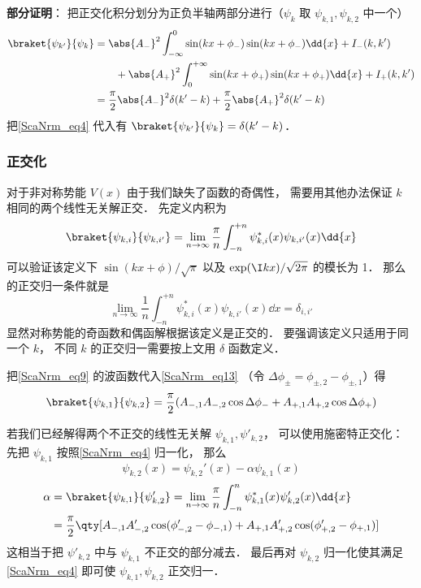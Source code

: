 \textbf{部分证明}： 把正交化积分划分为正负半轴两部分进行（$\psi_{k}$ 取 $\psi_{k,1}, \psi_{k,2}$ 中一个）
\begin{equation}
\begin{aligned}
\braket{\psi_{k'}}{\psi_{k}} &= \abs{A_-}^2\int_{-\infty}^0 \sin(kx + \phi_{-})\sin(kx + \phi_{-}) \dd{x} + I_-(k,k')\\
&\qquad+ \abs{A_+}^2\int_0^{+\infty} \sin(kx + \phi_{+})\sin(kx + \phi_{+}) \dd{x}   + I_+(k,k')\\
&= \frac{\pi}{2}\abs{A_-}^2\delta(k'-k) + \frac{\pi}{2}\abs{A_+}^2 \delta(k'-k)
\end{aligned}
\end{equation}
把\autoref{ScaNrm_eq4} 代入有 $\braket{\psi_{k'}}{\psi_{k}} = \delta(k'-k)$．

\subsubsection{正交化}
对于非对称势能 $V(x)$ 由于我们缺失了函数的奇偶性， 需要用其他办法保证 $k$ 相同的两个线性无关解正交． 先定义内积为
\begin{equation}\label{ScaNrm_eq13}
\braket{\psi_{k,i}}{\psi_{k,i'}} = \lim_{n\to\infty}\frac{\pi}{n}\int_{-n}^{+n} \psi_{k,i}^*(x) \psi_{k,i'}(x) \dd{x}
\end{equation}
可以验证该定义下 $\sin(kx+\phi)/\sqrt{\pi}$ 以及 $\exp(\I kx)/\sqrt{2\pi}$ 的模长为 1． 那么的正交归一条件就是
\begin{equation}\label{ScaNrm_eq7}
\lim_{n\to\infty}\frac{1}{n}\int_{-n}^{+n} \psi_{k,i}^*(x) \psi_{k,i'}(x) \dd{x} = \delta_{i,i'}
\end{equation}
显然对称势能的奇函数和偶函解根据该定义是正交的． 要强调该定义只适用于同一个 $k$， 不同 $k$ 的正交归一需要按上文用 $\delta$ 函数定义．

把\autoref{ScaNrm_eq9} 的波函数代入\autoref{ScaNrm_eq13} （令 $\Delta\phi_\pm = \phi_{\pm, 2} - \phi_{\pm, 1}$）得
\begin{equation}
\braket{\psi_{k,1}}{\psi_{k,2}} = \frac{\pi}{2}(A_{-,1}A_{-,2}\cos\Delta\phi_- + A_{+,1}A_{+,2}\cos\Delta\phi_+)
\end{equation}


若我们已经解得两个不正交的线性无关解 $\psi_{k,1}, \psi'_{k,2}$， 可以使用施密特正交化： 先把 $\psi_{k,1}$ 按照\autoref{ScaNrm_eq4} 归一化， 那么
\begin{equation}
\psi_{k,2}(x) = \psi_{k,2}'(x) - \alpha \psi_{k,1}(x)
\end{equation}
\begin{equation}\label{ScaNrm_eq5}
\begin{aligned}
\alpha &= \braket{\psi_{k,1}}{\psi'_{k,2}} = \lim_{n\to\infty} \frac{\pi}{n} \int_{-n}^n \psi_{k,1}^*(x) \psi'_{k,2}(x) \dd{x}\\
&= \frac{\pi}{2} \qty[A_{-,1}A'_{-,2}\cos(\phi_{-,2}'-\phi_{-,1}) + A_{+,1}A'_{+,2}\cos(\phi_{+,2}'-\phi_{+,1})]
\end{aligned}
\end{equation}
这相当于把 $\psi'_{k,2}$ 中与 $\psi_{k,1}$ 不正交的部分减去． 最后再对 $\psi_{k,2}$ 归一化使其满足\autoref{ScaNrm_eq4} 即可使 $\psi_{k,1}, \psi_{k,2}$ 正交归一．

